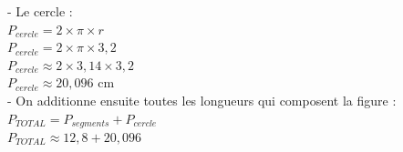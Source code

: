 \documentclass[a4paper,11pt]{article}
\begin{document}
- Le   cercle : \\


$P_{cercle} = 2 \times \pi \times r $\\

$P_{cercle} = 2 \times \pi \times 3,2 $\\

$P_{cercle} \approx 2 \times 3,14 \times 3,2 $\\

$P_{cercle} \approx 20,096$ cm\\



- On additionne ensuite toutes les longueurs qui composent la figure :\\

$P_{TOTAL} = P_{segments} + P_{cercle} $\\

$P_{TOTAL} \approx 12,8 + 20,096 $\\

 \\
\end{document}
